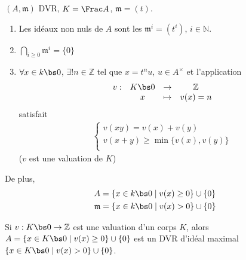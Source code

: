         \begin{prop}
            $(A, \mathfrak{m})$ DVR, $K = \Frac A$, $\mathfrak{m} = (t)$.
            \begin{enumerate}
                \item Les idéaux non nuls de $A$ sont les $\mathfrak{m}^i = (t^i)$, $i \in \mathbb{N}$.
                \item $\bigcap_{i \geq 0} \mathfrak{m}^i = \{0\}$
                \item $\forall x \in k \bs 0$, $\exists ! n \in \mathbb{Z}$ tel que $x = t^nu$, $u \in A^\times$ et l'application
                \begin{align*}
                    \begin{array}{cccc}
                        v : & K \bs 0 & \to & \mathbb{Z} \\
                        & x & \mapsto & v(x) = n \\
                    \end{array}
                \end{align*}
                satisfait 
                \begin{align*}
                    \begin{cases}
                        v(xy) = v(x) + v(y) \\
                        v(x + y) \geq \min \{v(x), v(y)\} \\
                    \end{cases}
                \end{align*}
                ($v$ est une valuation de $K$)
            \end{enumerate}
            De plus,
            \begin{align*}
                &A = \{x \in k \bs 0 \mid v(x) \geq 0\} \cup \{0\} \\
                &\mathfrak{m} = \{x \in k \bs 0 \mid v(x) > 0\} \cup \{0\} \\
            \end{align*}
        \end{prop}
        \begin{exo}
            Si $v : K \bs 0 \to \mathbb{Z}$ est une valuation d'un corps $K$, alors $A = \{x \in K \bs 0 \mid v(x) \geq 0\} \cup \{0\}$ est un DVR d'idéal maximal $\{x \in K \bs 0 \mid v(x) > 0\} \cup \{0\}$.
        \end{exo}
